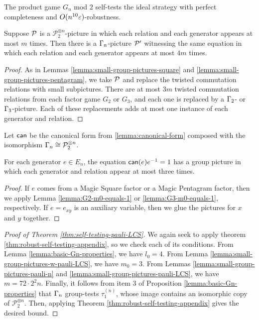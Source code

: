 \begin{thm}\label{thm:self-testing-pauli-LCS}

The product game $G_n$ mod $2$ self-tests the ideal strategy with perfect completeness and $O(n^{10}\varepsilon)$-robustness.
\end{thm}

\begin{lemma}\label{lemma:small-group-pictures-pauli-LCS}
	Suppose $\mathcal P$ is a $\mathcal{P}_2^{\otimes n}$-picture in which each relation and each generator appears at most $m$ times. Then there is a $\Gamma_n$-picture $\mathcal P'$ witnessing the same equation in which each relation and each generator appears at most $4m$ times. 
\end{lemma}
\begin{proof}
	As in Lemmas \ref{lemma:small-group-pictures-square} and \ref{lemma:small-group-pictures-pentagram}, we take $\mathcal P$ and replace the twisted commutation relations with small subpictures. There are at most $3m$ twisted commutation relations from each factor game $G_2$ or $G_3$, and each one is replaced by a $\Gamma_2$- or $\Gamma_3$-picture. Each of these replacements adds at most one instance of each generator and relation.
\end{proof}

Let $\operatorname*{\mathsf{can}}$ be the canonical form from \ref{lemma:canonical-form} composed with the isomorphism $\Gamma_n \cong \mathcal{P}_2^{\otimes n}$.
\begin{lemma}
\label{lemma:small-group-pictures-w-pauli-LCS}
	For each generator $e\in E_n$, the equation $\operatorname*{\mathsf{can}}(e)e^{-1} = 1$ has a group picture in which each generator and relation appear at most three times. 
\end{lemma}
\begin{proof}
	If $e$ comes from a Magic Square factor or a Magic Pentagram factor, then we apply Lemma \ref{lemma:G2-m0-equals-1} or \ref{lemma:G3-m0-equals-1}, respectively. If $e = e_{xy}$ is an auxiliary variable, then we glue the pictures for $x$ and $y$ together.
\end{proof}



\begin{proof}[Proof of Theorem \ref{thm:self-testing-pauli-LCS}]
	We again seek to apply theorem \ref{thm:robust-self-testing-appendix}, so we check each of its conditions. From Lemma \ref{lemma:basic-Gn-properties}, we have 
	$l_0 = 4$. 
	From Lemma \ref{lemma:small-group-pictures-w-pauli-LCS}, we have $m_0 = 3$.  
	From Lemmas \ref{lemma:small-group-pictures-pauli-n} and \ref{lemma:small-group-pictures-pauli-LCS}, we have $m = 72\cdot 2^2n$.
	Finally, it follows from item $3$ of Proposition \ref{lemma:basic-Gn-properties} that $\Gamma_n$ group-tests $\tau_1^{(n)}$, whose image contains an isomorphic copy of $\mathcal{P}_2^{\otimes n}$.  Then, applying Theorem \ref{thm:robust-self-testing-appendix} gives the desired bound.
	
\end{proof}


